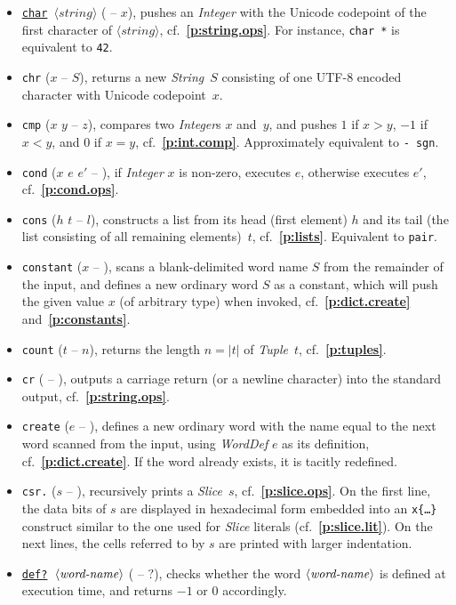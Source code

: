 \documentclass[12pt,oneside]{article}
\def\refpoint#1{{\rm\textbf{\ref{#1}}}}
\let\ptref=\refpoint
\begin{document}
\begin{itemize}
\item {\tt \underline{char} $\langle\textit{string}\rangle$} ( -- $x$), pushes an {\em Integer\/} with the Unicode codepoint of the first character of {\tt $\langle\textit{string}\rangle$}, cf.~\ptref{p:string.ops}. For instance, {\tt char *} is equivalent to {\tt 42}.
\item {\tt chr} ($x$ -- $S$), returns a new {\em String\/}~$S$ consisting of one UTF-8 encoded character with Unicode codepoint~$x$.
\item {\tt cmp} ($x$ $y$ -- $z$), compares two {\em Integer\/}s $x$ and~$y$, and pushes $1$ if $x>y$, $-1$ if $x<y$, and $0$ if $x=y$, cf.~\ptref{p:int.comp}. Approximately equivalent to {\tt - sgn}.
\item {\tt cond} ($x$ $e$ $e'$ -- ), if {\em Integer\/} $x$ is non-zero, executes $e$, otherwise executes $e'$, cf.~\ptref{p:cond.ops}.
\item {\tt cons} ($h$ $t$ -- $l$), constructs a list from its head (first element) $h$ and its tail (the list consisting of all remaining elements)~$t$, cf.~\ptref{p:lists}. Equivalent to {\tt pair}.
\item {\tt constant} ($x$ -- ), scans a blank-delimited word name $S$ from the remainder of the input, and defines a new ordinary word $S$ as a constant, which will push the given value $x$ (of arbitrary type) when invoked, cf.~\ptref{p:dict.create} and~\ptref{p:constants}.
\item {\tt count} ($t$ -- $n$), returns the length $n=|t|$ of {\em Tuple\/}~$t$, cf.~\ptref{p:tuples}.
\item {\tt cr} ( -- ), outputs a carriage return (or a newline character) into the standard output, cf.~\ptref{p:string.ops}.
\item {\tt create} ($e$ -- ), defines a new ordinary word with the name equal to the next word scanned from the input, using {\em WordDef\/} $e$ as its definition, cf.~\ptref{p:dict.create}. If the word already exists, it is tacitly redefined.
\item {\tt csr.} ($s$ -- ), recursively prints a {\em Slice}~$s$, cf.~\ptref{p:slice.ops}. On the first line, the data bits of $s$ are displayed in hexadecimal form embedded into an {\tt x\{\dots\}} construct similar to the one used for {\em Slice\/} literals (cf.~\ptref{p:slice.lit}). On the next lines, the cells referred to by $s$ are printed with larger indentation.
\item {\tt \underline{def?} $\langle\textit{word-name\/}\rangle$} ( -- $?$), checks whether the word $\langle\textit{word-name\/}\rangle$ is defined at execution time, and returns $-1$ or $0$ accordingly.

\end{itemize}
\end{document}
